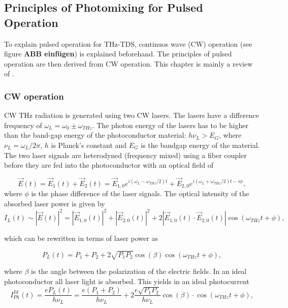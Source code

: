 \subsection{Principles of Photomixing for Pulsed Operation}
To explain pulsed operation for THz-TDS, continuos wave (CW) operation (see figure \textbf{ABB einfügen}) is explained beforehand. The principles of pulsed operation are then derived from CW operation. This chapter is mainly a review of \cite{nandiErAsInAlGaAsPhotoconductors2021,faridiPulsedFreeSpace2023,preuPrinciplesTHzGeneration2015}.

\subsubsection{CW operation}
CW THz radiation is generated using two CW lasers. The lasers have a difference frequency of $\omega_L = \omega_0 \pm \omega_{THz}$. The photon energy of the lasers has to be higher than the band-gap energy of the photoconductor material: $h\nu_L > E_G$, 
where $\nu_L = \omega_L / 2\pi$, $h$ is Planck’s constant and $E_G$ is the bandgap energy of the material. The two laser signals are heterodyned (frequency mixed) using a fiber coupler before they are fed into the photoconductor with an optical field of

\begin{equation}
	\vec{E}(t) = \vec{E}_1(t) + \vec{E}_2(t) = \vec{E}_{1,0}e^{i(\omega_L - \omega_{THz}/2)t} + \vec{E}_{2,0}e^{i(\omega_L + \omega_{THz}/2)t - i\phi},
\end{equation}
where $\phi$ is the phase difference of the laser signals. The optical intensity of the absorbed laser power is given by 
\begin{equation}
	I_L(t) \sim |\vec{E}(t)|^2 = |\vec{E}_{1,0}(t)|^2 + |\vec{E}_{2,0}(t)|^2 + 2|\vec{E}_{1,0}(t) \cdot \vec{E}_{2,0}(t)|\cos(\omega_{THz}t + \phi), 
\end{equation}

which can be rewritten in terms of laser power as 

\begin{equation}
	P_L(t) = P_1 + P_2 + 2\sqrt{P_1 P_2}\cos(\beta)\cos(\omega_{THz}t + \phi), 
\end{equation}

where $\beta$ is the angle between the polarization of the electric fields. In an ideal photoconductor all laser light is absorbed. This yields in an ideal photocurrent 
\begin{equation}
	I_{Ph}^{Id}(t) = \frac{eP_L(t)}{h\nu_L} = \frac{e(P_1+P_2)}{h\nu_L} + 2\frac{e\sqrt{P_1P_2}}{h\nu_L}\cos(\beta)\cdot\cos(\omega_{THz}t + \phi),
	\label{eq_iph}
\end{equation}

